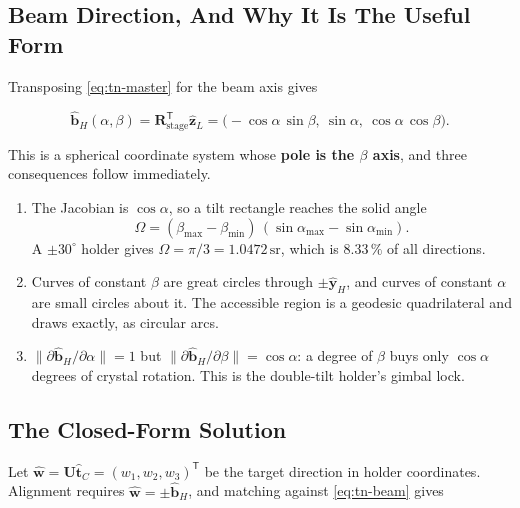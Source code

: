 \subsection{Beam Direction, And Why It Is The Useful Form}

Transposing \eqref{eq:tn-master} for the beam axis gives

\begin{equation}
\hat{\mathbf{b}}_H(\alpha,\beta)
= \mathbf{R}_{\text{stage}}^{\mathsf T}\hat{\mathbf{z}}_L
= \bigl(-\cos\alpha\,\sin\beta,\ \sin\alpha,\ \cos\alpha\,\cos\beta\bigr).
\label{eq:tn-beam}
\end{equation}

This is a spherical coordinate system whose \textbf{pole is the $\beta$ axis}, and three
consequences follow immediately.

\begin{enumerate}
  \item The Jacobian is $\cos\alpha$, so a tilt rectangle reaches the solid angle
    \begin{equation}
    \Omega = (\beta_{\max} - \beta_{\min})\,(\sin\alpha_{\max} - \sin\alpha_{\min}).
    \label{eq:tn-solid-angle}
    \end{equation}
    A $\pm 30^{\circ}$ holder gives $\Omega = \pi/3 = 1.0472\,\mathrm{sr}$, which is
    $8.33\,\%$ of all directions.
  \item Curves of constant $\beta$ are great circles through $\pm\hat{\mathbf{y}}_H$, and curves of
    constant $\alpha$ are small circles about it. The accessible region is a geodesic quadrilateral
    and draws exactly, as circular arcs.
  \item $\lVert \partial\hat{\mathbf{b}}_H/\partial\alpha \rVert = 1$ but
    $\lVert \partial\hat{\mathbf{b}}_H/\partial\beta \rVert = \cos\alpha$: a degree of $\beta$ buys
    only $\cos\alpha$ degrees of crystal rotation. This is the double-tilt holder's gimbal lock.
\end{enumerate}

\subsection{The Closed-Form Solution}

Let $\hat{\mathbf{w}} = \mathbf{U}\hat{\mathbf{t}}_C = (w_1, w_2, w_3)^{\mathsf T}$ be the target
direction in holder coordinates. Alignment requires $\hat{\mathbf{w}} = \pm\hat{\mathbf{b}}_H$,
and matching against \eqref{eq:tn-beam} gives

